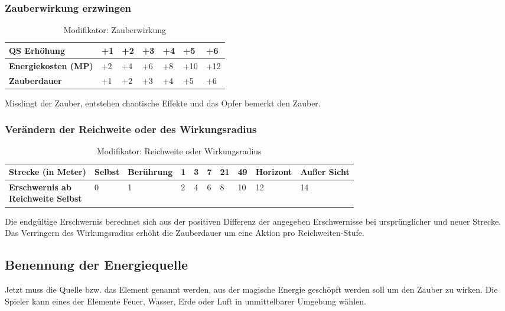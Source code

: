 \subsubsection{Zauberwirkung erzwingen}
\begin{table}[H]
\begin{center}
\begin{tabular}{|l|l|l|l|l|l|l|}
\hline
\textbf{QS Erhöhung} & +1 & +2 & +3 & +4 & +5 & +6 \\ \hline
\textbf{Energiekosten (MP)} & +2 & +4 & +6 & +8 & +10 & +12 \\ \hline
\textbf{Zauberdauer} & +1 & +2 & +3 & +4 & +5 & +6 \\ \hline

\end{tabular}
\end{center}
\caption{Modifikator: Zauberwirkung}
\label{tab:modifikator_zauberwirkung}
\end{table}
Misslingt der Zauber, entstehen chaotische Effekte und das Opfer bemerkt den Zauber.


\subsubsection{Verändern der Reichweite oder des Wirkungsradius}
\begin{table}[H]
\begin{center}
\begin{tabular}{|l|l|l|l|l|l|l|l|l|l|}
\hline
\textbf{Strecke (in Meter)} & Selbst & Berührung & 1 & 3 & 7 & 21 & 49 & Horizont & Außer Sicht \\ \hline
\brcell{\textbf{Erschwernis ab}\\\textbf{Reichweite Selbst}} & 0 & 1 & 2 & 4 & 6 & 8 & 10 & 12 & 14 \\ \hline

\end{tabular}
\end{center}
\caption{Modifikator: Reichweite oder Wirkungsradius}
\label{tab:modifikator_reichweite_oder_wirkungsradius}
\end{table}
Die endgültige Erschwernis berechnet sich aus der positiven Differenz der angegeben Erschwernisse bei ursprünglicher und neuer Strecke. Das Verringern des Wirkungsradius erhöht die Zauberdauer um eine Aktion pro Reichweiten-Stufe.


\subsection{Benennung der Energiequelle}
\label{chap:energiequelle_benennen}
Jetzt muss die Quelle bzw. das Element genannt werden, aus der magische Energie geschöpft werden soll um den Zauber zu wirken. Die Spieler kann eines der Elemente Feuer, Wasser, Erde oder Luft in unmittelbarer Umgebung wählen.

